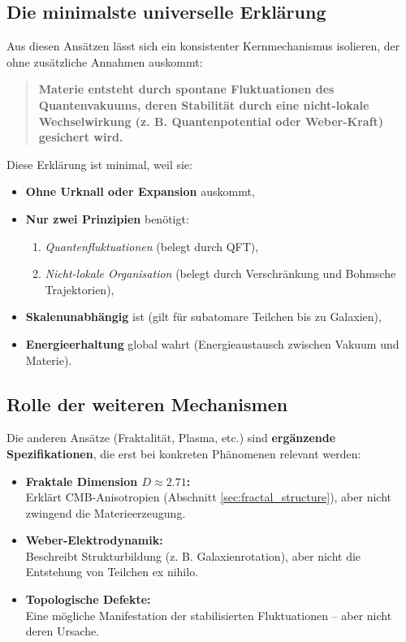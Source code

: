 \subsection{Die minimalste universelle Erklärung}
Aus diesen Ansätzen lässt sich ein konsistenter Kernmechanismus isolieren, der ohne zusätzliche Annahmen auskommt:
\begin{quote}
    \textbf{Materie entsteht durch spontane Fluktuationen des Quantenvakuums, deren Stabilität durch eine nicht-lokale Wechselwirkung (z. B. Quantenpotential oder Weber-Kraft) gesichert wird.}
\end{quote}
Diese Erklärung ist minimal, weil sie:
\begin{itemize}
    \item \textbf{Ohne Urknall oder Expansion} auskommt,
    \item \textbf{Nur zwei Prinzipien} benötigt:
    \begin{enumerate}
        \item \textit{Quantenfluktuationen} (belegt durch QFT),
        \item \textit{Nicht-lokale Organisation} (belegt durch Verschränkung und Bohmsche Trajektorien),
    \end{enumerate}
    \item \textbf{Skalenunabhängig} ist (gilt für subatomare Teilchen bis zu Galaxien),
    \item \textbf{Energieerhaltung} global wahrt (Energieaustausch zwischen Vakuum und Materie).
\end{itemize}

\subsection{Rolle der weiteren Mechanismen}
Die anderen Ansätze (Fraktalität, Plasma, etc.) sind \textbf{ergänzende Spezifikationen}, die erst bei konkreten Phänomenen relevant werden:
\begin{itemize}
    \item \textbf{Fraktale Dimension $D \approx 2.71$:}\\Erklärt CMB-Anisotropien (Abschnitt \ref{sec:fractal_structure}), aber nicht zwingend die Materieerzeugung.
    \item \textbf{Weber-Elektrodynamik:}\\Beschreibt Strukturbildung (z. B. Galaxienrotation), aber nicht die Entstehung von Teilchen ex nihilo.
    \item \textbf{Topologische Defekte:}\\Eine mögliche Manifestation der stabilisierten Fluktuationen – aber nicht deren Ursache.
\end{itemize}

